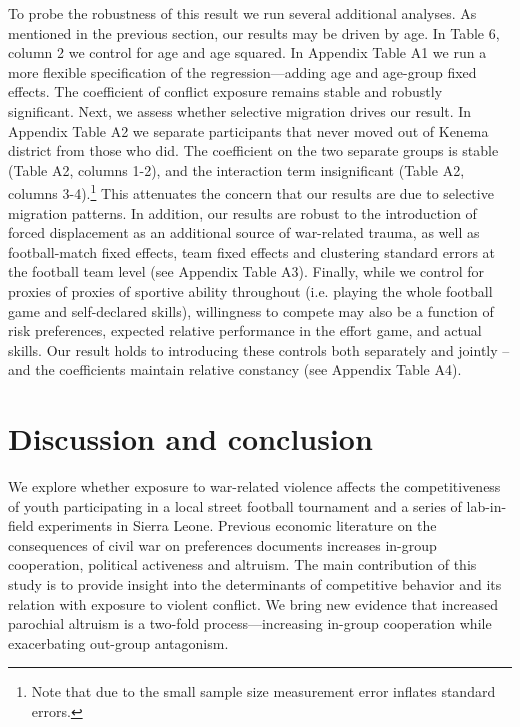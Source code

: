 To probe the robustness of this result we run several additional analyses. As mentioned in the previous section, our results may be driven by age. In Table 6, column 2 we control for age and age squared. In Appendix Table A1 we run a more flexible specification of the regression—adding age and age-group fixed effects. The coefficient of conflict exposure remains stable and robustly significant. Next, we assess whether selective migration drives our result. In Appendix Table A2 we separate participants that never moved out of Kenema district from those who did. The coefficient on the two separate groups is stable (Table A2, columns 1-2), and the interaction term insignificant (Table A2, columns 3-4).\footnote{Note that due to the small sample size measurement error inflates standard errors.}  This attenuates the concern that our results are due to selective migration patterns. In addition, our results are robust to the introduction of forced displacement as an additional source of war-related trauma, as well as football-match fixed effects, team fixed effects and clustering standard errors at the football team level (see Appendix Table A3). Finally, while we control for proxies of proxies of sportive ability throughout (i.e. playing the whole football game and self-declared skills), willingness to compete may also be a function of risk preferences, expected relative performance in the effort game, and actual skills. Our result holds to introducing these controls both separately and jointly – and the coefficients maintain relative constancy (see Appendix Table A4).

\section{Discussion and conclusion}
\label{sec:slf:discussion}
We explore whether exposure to war-related violence affects the competitiveness of youth participating in a local street football tournament and a series of lab-in-field experiments in Sierra Leone. Previous economic literature on the consequences of civil war on preferences documents increases in-group cooperation, political activeness and altruism. The main contribution of this study is to provide insight into the determinants of competitive behavior and its relation with exposure to violent conflict. We bring new evidence that increased parochial altruism is a two-fold process—increasing in-group cooperation while exacerbating out-group antagonism. 

